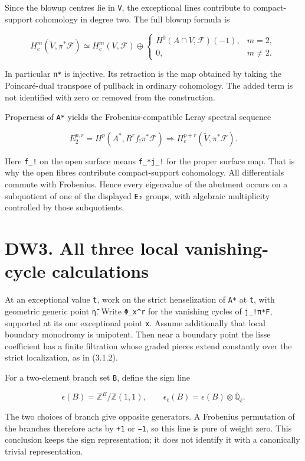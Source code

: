 \documentclass[
]{report}
\begin{document}
Since the blowup centres lie in \texttt{V}, the exceptional lines
contribute to compact-support cohomology in degree two. The full blowup
formula is

\[
H_c^m(\widetilde V,\pi^*\mathcal F)
\simeq H_c^m(V,\mathcal F)
\oplus
\begin{cases}H^0(A\cap V,\mathcal F)(-1),&m=2,\\0,&m\ne2.\end{cases}
\tag{DW2.2}
\]

In particular \texttt{π*} is injective. Its retraction is the map
obtained by taking the Poincaré-dual transpose of pullback in ordinary
cohomology. The added term is not identified with zero or removed from
the construction.

Properness of \texttt{A*} yields the Frobenius-compatible Leray spectral
sequence

\[
E_2^{p,r}=H^p(A^*,R^rf_!\pi^*\mathcal F)
\Longrightarrow H_c^{p+r}(\widetilde V,\pi^*\mathcal F).
\tag{DW2.3}
\]

Here \texttt{f\_!} on the open surface means \texttt{f\_*j\_!} for the
proper surface map. That is why the open fibres contribute
compact-support cohomology. All differentials commute with Frobenius.
Hence every eigenvalue of the abutment occurs on a subquotient of one of
the displayed \texttt{E₂} groups, with algebraic multiplicity controlled
by those subquotients.

\section{DW3. All three local vanishing-cycle
calculations}\label{dw3.-all-three-local-vanishing-cycle-calculations}

At an exceptional value \texttt{t}, work on the strict henselization of
\texttt{A*} at \texttt{t}, with geometric generic point \texttt{η̄}.
Write \texttt{Φ\_x\^{}r} for the vanishing cycles of \texttt{j\_!π*F},
supported at its one exceptional point \texttt{x}. Assume additionally
that local boundary monodromy is unipotent. Then near a boundary point
the lisse coefficient has a finite filtration whose graded pieces extend
constantly over the strict localization, as in (3.1.2).

For a two-element branch set \texttt{B}, define the sign line

\[
\epsilon(B)=\mathbb Z^B/\mathbb Z(1,1),
\qquad \epsilon_\ell(B)=\epsilon(B)\otimes\overline{\mathbb Q}_\ell.
\tag{DW3.1}
\]

The two choices of branch give opposite generators. A Frobenius
permutation of the branches therefore acts by \texttt{+1} or
\texttt{−1}, so this line is pure of weight zero. This conclusion keeps
the sign representation; it does not identify it with a canonically
trivial representation.
\end{document}
